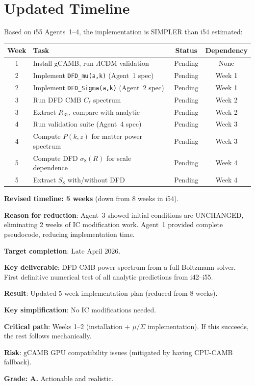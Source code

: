 \documentclass[11pt,a4paper]{article}
\begin{document}
\section{Updated Timeline}

Based on i55 Agents~1--4, the implementation is SIMPLER than i54 estimated:

\begin{center}
\begin{longtable}{clcc}
\toprule
\textbf{Week} & \textbf{Task} & \textbf{Status} & \textbf{Dependency} \\
\midrule
1 & Install gCAMB, run $\Lambda$CDM validation & Pending & None \\
2 & Implement \texttt{DFD\_mu(a,k)} (Agent~1 spec) & Pending & Week 1 \\
2 & Implement \texttt{DFD\_Sigma(a,k)} (Agent~2 spec) & Pending & Week 1 \\
3 & Run DFD CMB $C_\ell$ spectrum & Pending & Week 2 \\
3 & Extract $R_{31}$, compare with analytic & Pending & Week 2 \\
4 & Run validation suite (Agent~4 spec) & Pending & Week 3 \\
4 & Compute $P(k,z)$ for matter power spectrum & Pending & Week 3 \\
5 & Compute DFD $\sigma_8(R)$ for scale dependence & Pending & Week 4 \\
5 & Extract $S_8$ with/without DFD & Pending & Week 4 \\
\bottomrule
\end{longtable}
\end{center}

\textbf{Revised timeline: 5 weeks} (down from 8 weeks in i54).

\textbf{Reason for reduction}: Agent~3 showed initial conditions are UNCHANGED, eliminating 2 weeks of IC modification work. Agent~1 provided complete pseudocode, reducing implementation time.

\textbf{Target completion}: Late April 2026.

\textbf{Key deliverable}: DFD CMB power spectrum from a full Boltzmann solver. First definitive numerical test of all analytic predictions from i42--i55.

\begin{tcolorbox}[colback=green!5!white, colframe=green!60!black, title={Agent 16: gCAMB Timeline --- 5 WEEKS}]
\textbf{Result}: Updated 5-week implementation plan (reduced from 8 weeks).

\textbf{Key simplification}: No IC modifications needed.

\textbf{Critical path}: Weeks 1--2 (installation + $\mu/\Sigma$ implementation). If this succeeds, the rest follows mechanically.

\textbf{Risk}: gCAMB GPU compatibility issues (mitigated by having CPU-CAMB fallback).

\textbf{Grade: A.} Actionable and realistic.
\end{tcolorbox}
\end{document}
